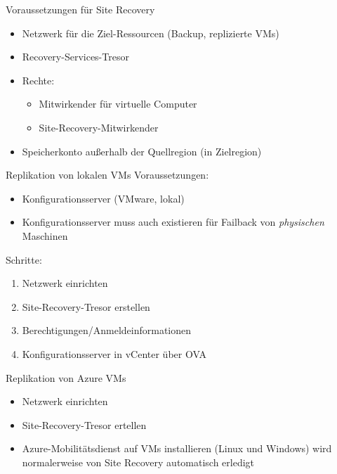 \begin{flashcard}[Definition]{Voraussetzungen für Site Recovery}
    \begin{itemize}
        \item Netzwerk für die Ziel-Ressourcen (Backup, replizierte VMs)
        \item Recovery-Services-Tresor
        \item Rechte:
            \begin{itemize}
                \item Mitwirkender für virtuelle Computer
                \item Site-Recovery-Mitwirkender
            \end{itemize}
        \item Speicherkonto außerhalb der Quellregion (in Zielregion)
    \end{itemize}
\end{flashcard}

\begin{flashcard}[Definition]{Replikation von lokalen VMs}
    Voraussetzungen:
    \begin{itemize}
        \item Konfigurationsserver (VMware, lokal)
        \item Konfigurationsserver muss auch existieren für Failback von \emph{physischen} Maschinen
    \end{itemize}
    Schritte:
    \begin{enumerate}
        \item Netzwerk einrichten
        \item Site-Recovery-Tresor erstellen
        \item Berechtigungen/Anmeldeinformationen
        \item Konfigurationsserver in vCenter über OVA
    \end{enumerate}

\end{flashcard}

\begin{flashcard}[Definition]{Replikation von Azure VMs}
    \begin{itemize}
        \item Netzwerk einrichten
        \item Site-Recovery-Tresor ertellen
        \item Azure-Mobilitätsdienst auf VMs installieren (Linux und Windows)\newline
            wird normalerweise von Site Recovery automatisch erledigt
    \end{itemize}
\end{flashcard}

